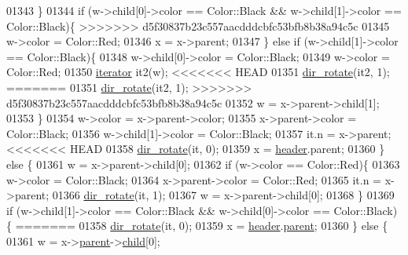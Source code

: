 \begin{DoxyCode}
01343             \}
01344             \textcolor{keywordflow}{if} (w->child[0]->color == Color::Black && w->child[1]->color == Color::Black)\{
>>>>>>> d5f30837b23c557aacdddcbfc53bfb8b38a94c5c
01345                 w->color = Color::Red;
01346                 x = x->parent;
01347             \} \textcolor{keywordflow}{else} \textcolor{keywordflow}{if} (w->child[1]->color == Color::Black)\{
01348                 w->child[0]->color = Color::Black;
01349                 w->color = Color::Red;
01350                 \hyperlink{classaed2_1_1iterator}{iterator} it2(w);
<<<<<<< HEAD
01351                 \hyperlink{classaed2_1_1map_a94f2862ada0c9ed4f4457eac42ea8f23_a94f2862ada0c9ed4f4457eac42ea8f23}{dir_rotate}(it2, 1);
=======
01351                 \hyperlink{classaed2_1_1map_a94f2862ada0c9ed4f4457eac42ea8f23_a94f2862ada0c9ed4f4457eac42ea8f23}{dir\_rotate}(it2, 1);
>>>>>>> d5f30837b23c557aacdddcbfc53bfb8b38a94c5c
01352                 w = x->parent->child[1];
01353             \}
01354             w->color = x->parent->color;
01355             x->parent->color = Color::Black;
01356             w->child[1]->color = Color::Black;
01357             it.n = x->parent;
<<<<<<< HEAD
01358             \hyperlink{classaed2_1_1map_a94f2862ada0c9ed4f4457eac42ea8f23_a94f2862ada0c9ed4f4457eac42ea8f23}{dir_rotate}(it, 0);
01359             x = \hyperlink{classaed2_1_1map_a92d93f905c8ad73fba18fdc7e8915cce_a92d93f905c8ad73fba18fdc7e8915cce}{header}.parent;
01360         \} \textcolor{keywordflow}{else} \{
01361             w = x->parent->child[0];
01362             \textcolor{keywordflow}{if} (w->color == Color::Red)\{
01363                 w->color = Color::Black;
01364                 x->parent->color = Color::Red;
01365                 it.n = x->parent;
01366                 \hyperlink{classaed2_1_1map_a94f2862ada0c9ed4f4457eac42ea8f23_a94f2862ada0c9ed4f4457eac42ea8f23}{dir_rotate}(it, 1);
01367                 w = x->parent->child[0];
01368             \}
01369             \textcolor{keywordflow}{if} (w->child[1]->color == Color::Black && w->child[0]->color == 
      Color::Black)\{
=======
01358             \hyperlink{classaed2_1_1map_a94f2862ada0c9ed4f4457eac42ea8f23_a94f2862ada0c9ed4f4457eac42ea8f23}{dir\_rotate}(it, 0);
01359             x = \hyperlink{classaed2_1_1map_a92d93f905c8ad73fba18fdc7e8915cce_a92d93f905c8ad73fba18fdc7e8915cce}{header}.\hyperlink{structaed2_1_1map_1_1Node_a91a1855da19d22344bc89c2f8b998a7a_a91a1855da19d22344bc89c2f8b998a7a}{parent};
01360         \} \textcolor{keywordflow}{else} \{
01361             w = x->\hyperlink{structaed2_1_1map_1_1Node_a91a1855da19d22344bc89c2f8b998a7a_a91a1855da19d22344bc89c2f8b998a7a}{parent}->\hyperlink{structaed2_1_1map_1_1Node_acac3478cefbd8bebe0c3f3abb9a2935e_acac3478cefbd8bebe0c3f3abb9a2935e}{child}[0];

\end{DoxyCode}
